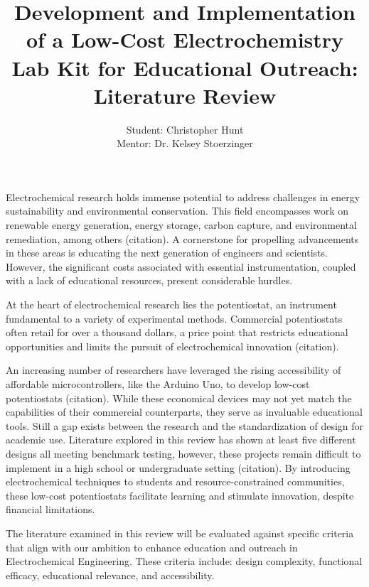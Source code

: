 \documentclass{article}
\title{\textcolor{mycolor}{\textbf{{\huge Development and Implementation of a Low-Cost Electrochemistry Lab Kit for Educational Outreach: Literature Review}}}}
\author{Student: Christopher Hunt \\ Mentor: Dr. Kelsey Stoerzinger}
\date{}
\begin{document}
\pagestyle{fancy}
\fancyhf{}
\rfoot{}
\rhead{\thepage}
\maketitle
Electrochemical research holds immense potential to address challenges in energy sustainability and environmental conservation. This field encompasses work on renewable energy generation, energy storage, carbon capture, and environmental remediation, among others (citation). A cornerstone for propelling advancements in these areas is educating the next generation of engineers and scientists. However, the significant costs associated with essential instrumentation, coupled with a lack of educational resources, present considerable hurdles.

At the heart of electrochemical research lies the potentiostat, an instrument fundamental to a variety of experimental methods. Commercial potentiostats often retail for over a thousand dollars, a price point that restricts educational opportunities and limits the pursuit of electrochemical innovation (citation).

An increasing number of researchers have leveraged the rising accessibility of affordable microcontrollers, like the Arduino Uno, to develop low-cost potentiostats (citation). While these economical devices may not yet match the capabilities of their commercial counterparts, they serve as invaluable educational tools. Still a gap exists between the research and the standardization of design for academic use. Literature explored in this review has shown at least five different designs all meeting benchmark testing, however, these projects remain difficult to implement in a high school or undergraduate setting (citation). By introducing electrochemical techniques to students and resource-constrained communities, these low-cost potentiostats facilitate learning and stimulate innovation, despite financial limitations.

The literature examined in this review will be evaluated against specific criteria that align with our ambition to enhance education and outreach in Electrochemical Engineering. These criteria include: design complexity, functional efficacy, educational relevance, and accessibility.
 
\end{document}
